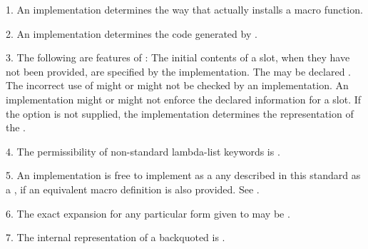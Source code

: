 \item{1.}
An implementation determines the way that 
actually installs a macro function.

\item{2.}
An implementation determines the code generated by .

\item{3.}
The following are  features of :
\beginlist
{} The initial contents of a slot, when they have not been provided,
are specified by the implementation.
 The   may be declared .
 The incorrect use of   might or might not be checked
by an implementation.
An implementation might or might not enforce the declared  information
for a slot.
 If the  option is not supplied,
the implementation determines the representation of the . 
\endlist

\item{4.} The permissibility of non-standard lambda-list
keywords is .

\item{5.} 
An implementation is free to implement as a 
any  described in this standard as a ,
if an equivalent macro definition is also provided.
See .

\item{6.} 
The exact expansion for any particular form given to  
may be .

\item{7.} The internal representation of 
a backquoted  is .

\endlist
\endsubSection%

\endsubSection%




